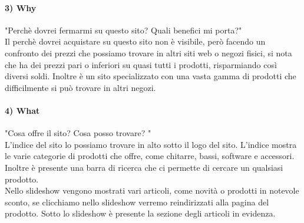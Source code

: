 \documentclass[12pt]{article}
\begin{document}
	\paragraph{3) Why} "Perchè dovrei fermarmi su questo sito? Quali benefici mi porta?"
	\\
	Il perchè dovrei acquistare su questo sito non è visibile, però facendo un confronto dei prezzi che possiamo trovare in altri siti web o negozi fisici, si nota che ha dei prezzi pari o inferiori su quasi tutti i prodotti, risparmiando così diversi soldi. Inoltre è un sito specializzato con una vasta gamma di prodotti che difficilmente si può trovare in altri negozi.
	\paragraph{4) What} "Cosa offre il sito? Cosa posso trovare? "
	\\
	L'indice del sito lo possiamo trovare in alto sotto il logo del sito. L'indice mostra le varie categorie di prodotti che offre, come chitarre, bassi, software e accessori. Inoltre è presente una barra di ricerca che ci permette di cercare un qualsiasi prodotto. \\ Nello slideshow vengono mostrati vari articoli, come novità o prodotti in notevole sconto, se clicchiamo nello slideshow verremo reindirizzati alla pagina del prodotto. Sotto lo slideshow è presente la sezione degli articoli in evidenza.
	
\end{document}
